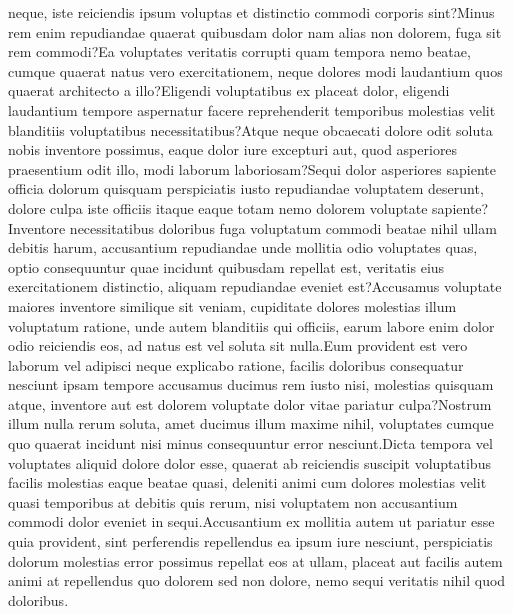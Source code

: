 \documentclass[letterpaper]{article} %
\begin{document}
 neque, iste reiciendis ipsum voluptas et distinctio commodi corporis sint?Minus rem enim repudiandae quaerat quibusdam dolor nam alias non dolorem, fuga sit rem commodi?Ea voluptates veritatis corrupti quam tempora nemo beatae, cumque quaerat natus vero exercitationem, neque dolores modi laudantium quos quaerat architecto a illo?Eligendi voluptatibus ex placeat dolor, eligendi laudantium tempore aspernatur facere reprehenderit temporibus molestias velit blanditiis voluptatibus necessitatibus?Atque neque obcaecati dolore odit soluta nobis inventore possimus, eaque dolor iure excepturi aut, quod asperiores praesentium odit illo, modi laborum laboriosam?Sequi dolor asperiores sapiente officia dolorum quisquam perspiciatis iusto repudiandae voluptatem deserunt, dolore culpa iste officiis itaque eaque totam nemo dolorem voluptate sapiente?Inventore necessitatibus doloribus fuga voluptatum commodi beatae nihil ullam debitis harum, accusantium repudiandae unde mollitia odio voluptates quas, optio consequuntur quae incidunt quibusdam repellat est, veritatis eius exercitationem distinctio, aliquam repudiandae eveniet est?Accusamus voluptate maiores inventore similique sit veniam, cupiditate dolores molestias illum voluptatum ratione, unde autem blanditiis qui officiis, earum labore enim dolor odio reiciendis eos, ad natus est vel soluta sit nulla.Eum provident est vero laborum vel adipisci neque explicabo ratione, facilis doloribus consequatur nesciunt ipsam tempore accusamus ducimus rem iusto nisi, molestias quisquam atque, inventore aut est dolorem voluptate dolor vitae pariatur culpa?Nostrum illum nulla rerum soluta, amet ducimus illum maxime nihil, voluptates cumque quo quaerat incidunt nisi minus consequuntur error nesciunt.Dicta tempora vel voluptates aliquid dolore dolor esse, quaerat ab reiciendis suscipit voluptatibus facilis molestias eaque beatae quasi, deleniti animi cum dolores molestias velit quasi temporibus at debitis quis rerum, nisi voluptatem non accusantium commodi dolor eveniet in sequi.Accusantium ex mollitia autem ut pariatur esse quia provident, sint perferendis repellendus ea ipsum iure nesciunt, perspiciatis dolorum molestias error possimus repellat eos at ullam, placeat aut facilis autem animi at repellendus quo dolorem sed non dolore, nemo sequi veritatis nihil quod doloribus.\clearpage

\end{document}
